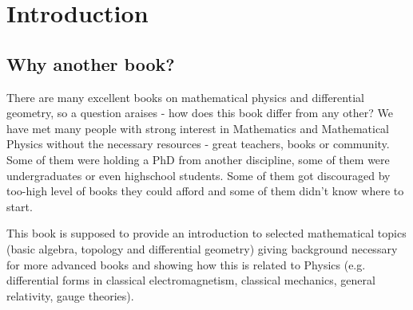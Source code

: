 \chapter{Introduction}
\label{introduction}

\section{Why another book?}

There are many excellent books on mathematical physics and differential geometry, so a question araises - how does this book differ from any other?
We have met many people with strong interest in Mathematics and Mathematical Physics without the necessary resources - great teachers, books or community. Some of them were holding a PhD from another discipline, some of them were undergraduates or even highschool students. Some of them got discouraged by too-high level of books they could afford and some of them didn't know where to start.

This book is supposed to provide an introduction to selected mathematical topics (basic algebra, topology and differential geometry) giving background necessary for more advanced books and showing how this is related to Physics (e.g. differential forms in classical electromagnetism, classical mechanics, general relativity, gauge theories).

